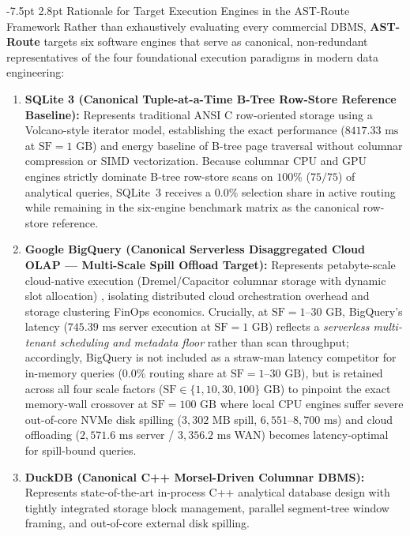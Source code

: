 \documentclass[10pt,a4paper]{article}
\makeatletter
\renewcommand\subsection{\@startsection{subsection}{2}{\z@}%
  {-7.5pt \@plus -2pt \@minus -1pt}%
  {2.8pt \@plus 1pt}%
  {\normalfont\normalsize\bfseries}}
\makeatother
\begin{document}
\subsection{Rationale for Target Execution Engines in the AST-Route Framework}
Rather than exhaustively evaluating every commercial DBMS, \textbf{AST-Route} targets six software engines that serve as canonical, non-redundant representatives of the four foundational execution paradigms in modern data engineering:
\begin{enumerate}[leftmargin=1.5em,itemsep=0.8pt]
    \item \textbf{SQLite 3 (Canonical Tuple-at-a-Time B-Tree Row-Store Reference Baseline):} Represents traditional ANSI C row-oriented storage using a Volcano-style iterator model, establishing the exact performance ($8417.33\text{ ms}$ at $\text{SF}=1\text{ GB}$) and energy baseline of B-tree page traversal without columnar compression or SIMD vectorization. Because columnar CPU and GPU engines strictly dominate B-tree row-store scans on $100\%$ ($75/75$) of analytical queries, SQLite~3 receives a $0.0\%$ selection share in active routing while remaining in the six-engine benchmark matrix as the canonical row-store reference.
    \item \textbf{Google BigQuery (Canonical Serverless Disaggregated Cloud OLAP --- Multi-Scale Spill Offload Target):} Represents petabyte-scale cloud-native execution (Dremel/Capacitor columnar storage with dynamic slot allocation) \cite{melnik2020dremel}, isolating distributed cloud orchestration overhead and storage clustering FinOps economics. Crucially, at $\text{SF}=1\text{--}30\text{ GB}$, BigQuery's latency ($745.39\text{ ms}$ server execution at $\text{SF}=1\text{ GB}$) reflects a \emph{serverless multi-tenant scheduling and metadata floor} rather than scan throughput; accordingly, BigQuery is not included as a straw-man latency competitor for in-memory queries ($0.0\%$ routing share at $\text{SF}=1\text{--}30\text{ GB}$), but is retained across all four scale factors ($\text{SF}\in\{1,10,30,100\}\text{ GB}$) to pinpoint the exact memory-wall crossover at $\text{SF}=100\text{ GB}$ where local CPU engines suffer severe out-of-core NVMe disk spilling ($3{,}302\text{ MB}$ spill, $6{,}551\text{--}8{,}700\text{ ms}$) and cloud offloading ($2{,}571.6\text{ ms}$ server / $3{,}356.2\text{ ms}$ WAN) becomes latency-optimal for spill-bound queries.
    \item \textbf{DuckDB (Canonical C++ Morsel-Driven Columnar DBMS):} Represents state-of-the-art in-process C++ analytical database design \cite{raasveldt2019duckdb, kuiper2024duckdb_ooc} with tightly integrated storage block management, parallel segment-tree window framing, and out-of-core external disk spilling.

\end{enumerate}
\end{document}
